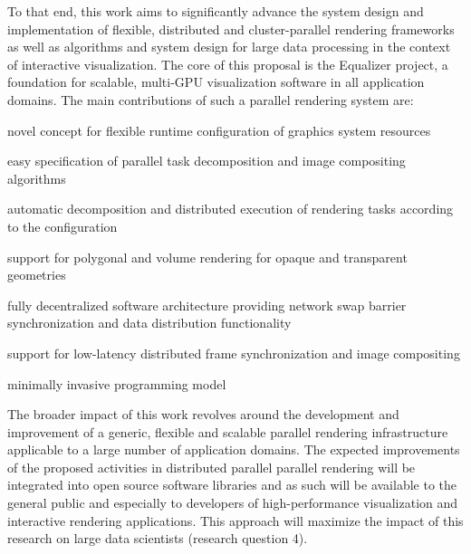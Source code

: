  To that end, this work aims to significantly advance the system design and
 implementation of flexible, distributed and cluster-parallel rendering
 frameworks as well as algorithms and system design for large data processing in
 the context of interactive visualization. The core of this proposal is the
 Equalizer project, a foundation for scalable, multi-GPU visualization software
 in all application domains. The main contributions of such a parallel rendering
 system are:
 \begin{compactenum}
  \item novel concept for flexible runtime configuration of graphics system resources
  \item easy specification of parallel task decomposition and image compositing algorithms
  \item automatic decomposition and distributed execution of rendering tasks according to the configuration
  \item support for polygonal and volume rendering for opaque and transparent geometries
  \item fully decentralized software architecture providing network swap barrier synchronization and data distribution functionality
  \item support for low-latency distributed frame synchronization and image compositing
  \item minimally invasive programming model
 \end{compactenum}

 The broader impact of this work revolves around the development and improvement
 of a generic, flexible and scalable parallel rendering infrastructure applicable
 to a large number of application domains. The expected improvements of the
 proposed activities in distributed parallel parallel rendering will be
 integrated into open source software libraries and as such will be available to
 the general public and especially to developers of high-performance
 visualization and interactive rendering applications. This approach will
 maximize the impact of this research on large data scientists (research question
 4).


